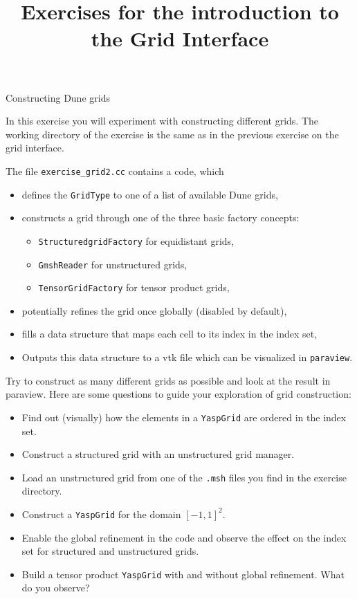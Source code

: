 \documentclass[12pt,a4paper]{article}
\title{\textbf{Exercises for the introduction to the Grid Interface}}
\begin{document}
\exerciseheader

\begin{Exercise}{Constructing Dune grids}

In this exercise you will experiment with constructing different grids. The working directory
of the exercise is the same as in the previous exercise on the grid interface.

The file \lstinline!exercise_grid2.cc! contains a code, which
\begin{itemize}
 \item defines the \lstinline!GridType! to one of a list of available Dune grids,
 \item constructs a grid through one of the three basic factory concepts:
  \begin{itemize}
   \item \lstinline!StructuredgridFactory! for equidistant grids,
   \item \lstinline!GmshReader! for unstructured grids,
   \item \lstinline!TensorGridFactory! for tensor product grids,
  \end{itemize}
 \item potentially refines the grid once globally (disabled by default),
 \item fills a data structure that maps each cell to its index in the index set,
 \item Outputs this data structure to a vtk file which can be visualized in \lstinline!paraview!.
\end{itemize}

Try to construct as many different grids as possible and look at the result in paraview.
Here are some questions to guide your exploration of grid construction:
\begin{itemize}
 \item Find out (visually) how the elements in a \lstinline!YaspGrid! are ordered in the index set.
 \item Construct a structured grid with an unstructured grid manager.
 \item Load an unstructured grid from one of the \lstinline!.msh! files you find in the exercise directory.
 \item Construct a \lstinline!YaspGrid! for the domain $[-1,1]^2$.
 \item Enable the global refinement in the code and observe the effect on the index set for structured and unstructured grids.
 \item Build a tensor product \lstinline!YaspGrid! with and without global refinement. What do you observe?
\end{itemize}

\end{Exercise}
\end{document}
